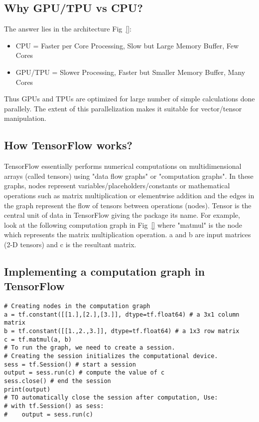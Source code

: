 \documentclass[10pt,letterpaper]{article}
\begin{document}
\subsection*{Why GPU/TPU vs CPU?}

The answer lies in the architecture Fig~\ref{}:  
\begin{itemize}
\item CPU = Faster per Core Processing, Slow but Large Memory Buffer, Few Cores
\item GPU/TPU = Slower Processing, Faster but Smaller Memory Buffer, Many Cores
\end{itemize}

Thus GPUs and TPUs are optimized for large number of simple calculations done parallely. The extent of this  parallelization makes it suitable for vector/tensor manipulation.

\subsection*{How TensorFlow works?}

TensorFlow essentially performs numerical computations on multidimensional arrays (called tensors) using "data flow graphs" or "computation graphs". In these graphs, nodes represent variables/placeholders/constants or mathematical operations such as matrix multiplication or elementwise addition and the edges in the graph represent the flow of tensors between operations (nodes). Tensor is the central unit of data in TensorFlow giving the package its name. For example, look at the following computation graph in Fig~\ref{} where "matmul" is the node which represents the matrix multiplication operation. a and b are input matrices (2-D tensors) and c is the resultant matrix.

\subsection*{Implementing a computation graph in TensorFlow}

\begin{verbatim}
# Creating nodes in the computation graph 
a = tf.constant([[1.],[2.],[3.]], dtype=tf.float64) # a 3x1 column matrix 
b = tf.constant([[1.,2.,3.]], dtype=tf.float64) # a 1x3 row matrix 
c = tf.matmul(a, b) 
# To run the graph, we need to create a session.
# Creating the session initializes the computational device.
sess = tf.Session() # start a session
output = sess.run(c) # compute the value of c
sess.close() # end the session
print(output)
# TO automatically close the session after computation, Use:
# with tf.Session() as sess:
#    output = sess.run(c) 
\end{verbatim}
\end{document}
